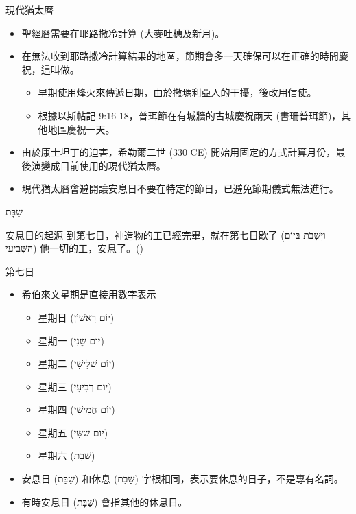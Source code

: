 \documentclass{beamer}
\newcommand{\topic}[1]{
\begin{frame}
    \centering
    \vspace*{1cm}
    {\fontsize{40}{48}\selectfont #1\par}
    \vfill
\end{frame}
}
\newcommand{\parvspace}{\par\vspace{0.5em}}
\begin{document}
\begin{frame}{現代猶太曆}
    \begin{itemize}
        \item 聖經曆需要在耶路撒冷計算 (大麥吐穗及新月)。
        \item 在無法收到耶路撒冷計算結果的地區，節期會多一天確保可以在正確的時間慶祝，這叫做\textcite{YomTovSheni}。
              \begin{itemize}
                  \item 早期使用烽火來傳遞日期，由於撒瑪利亞人的干擾，後改用信使。
                  \item 根據以斯帖記 9:16-18，普珥節在有城牆的古城慶祝兩天 (書珊普珥節)，其他地區慶祝一天。
              \end{itemize}
        \item 由於康士坦丁的迫害，希勒爾二世 (330 CE) 開始用固定的方式計算月份，最後演變成目前使用的現代猶太曆。
        \item 現代猶太曆會避開讓安息日不要在特定的節日，已避免節期儀式無法進行。\parencite{HistoryOfCalendar}
    \end{itemize}
\end{frame}

\topic{\texthebrew{שַׁבָּת}}

\begin{frame}{安息日的起源}
    到第七日，神造物的工已經完畢，就在\alert{第七日歇了 (\texthebrew{וַיִּשְׁבֹּת בַּיּוֹם הַשְּׁבִיעִי})} 他一切的工，安息了。()\parvspace
\end{frame}

\begin{frame}{第七日}
    \begin{itemize}
        \item 希伯來文星期是直接用數字表示
              \begin{itemize}
                  \item 星期日 (\texthebrew{יוֹם רִאשׁוֹן})
                  \item 星期一 (\texthebrew{יוֹם שֵׁנִי})
                  \item 星期二 (\texthebrew{יוֹם שְׁלִישִׁי})
                  \item 星期三 (\texthebrew{יוֹם רְבִיעִי})
                  \item 星期四 (\texthebrew{יוֹם חֲמִישִׁי})
                  \item 星期五 (\texthebrew{יוֹם שִׁשִּׁי})
                  \item 星期六 (\texthebrew{שַׁבָּת})
              \end{itemize}
        \item 安息日 (\texthebrew{שַׁבָּת}) 和休息 (\texthebrew{שָׁבַת}) 字根相同，表示要休息的日子，不是專有名詞。
        \item 有時安息日 (\texthebrew{שַׁבָּת}) 會指其他的休息日。
    \end{itemize}
\end{frame}
\end{document}
